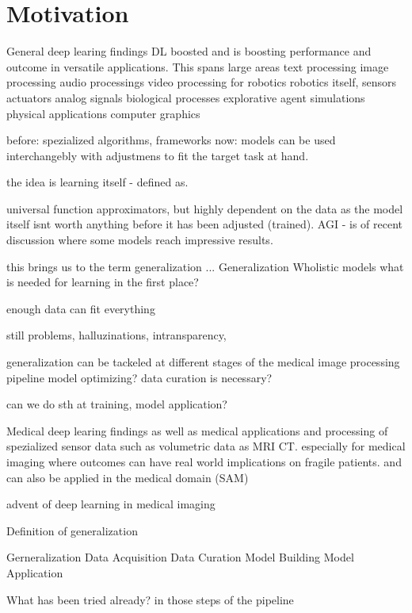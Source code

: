 \section{Motivation}

General deep learing findings
DL boosted and is boosting performance and outcome in versatile applications. This spans large areas
text processing
image processing
audio processings
video processing for robotics
robotics itself, sensors actuators
analog signals
biological processes
explorative agent simulations
physical applications
computer graphics


before: spezialized algorithms, frameworks
now: models can be used interchangebly with adjustmens to fit the target task at hand.

the idea is learning itself - defined as.



universal function approximators, but highly dependent on the data as the model itself isnt worth anything before it has been adjusted (trained).
AGI - is of recent discussion where some models reach impressive results.



this brings us to the term generalization ...
Generalization
Wholistic models
what is needed for learning in the first place?

enough data can fit everything

still  problems, halluzinations, intransparency,

generalization can be tackeled at different stages of the medical image processing pipeline
model optimizing?
data curation is necessary?

can we do sth at training, model application?

Medical deep learing findings
as well as medical applications and processing of spezialized sensor data such as volumetric data as MRI CT.
especially for medical imaging where outcomes can have real world implications on fragile patients.
and can also be applied in the medical domain (SAM)

advent of deep learning in medical imaging




Definition of generalization

Gerneralization
    Data Acquisition
    Data Curation
    Model Building
    Model Application

What has been tried already? in those steps of the pipeline



